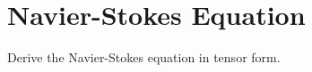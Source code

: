 \documentclass[../main-sheet.tex]{subfiles}
\begin{document}
\chapter{Navier-Stokes Equation}
\begin{prob}
    Derive the Navier-Stokes equation in tensor form.
\end{prob}
\begin{soln}



\end{soln}
\end{document}
